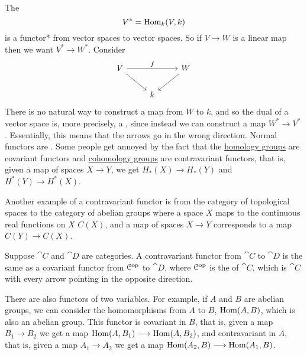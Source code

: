 \documentclass[11pt, oneside]{article}
\begin{document}
The \href{https://en.wikipedia.org/wiki/Dual_space}{}
$$
V^* = \operatorname{Hom}_k(V,k)
$$
is a functor* from vector spaces to vector spaces. So if $V\longrightarrow W$ is a linear map then we want $V^* \longrightarrow W^*$. Consider 
\[
\begin{tikzcd}
V \arrow[rr, "f"] \arrow[dr] && W\arrow[dl] \\ & k &
\end{tikzcd}
\]
There is no natural way to construct a map from $W$ to $k$, and so the dual of a vector space is, more precisely, a \href{https://en.wikipedia.org/wiki/Functor#Covariance_and_contravariance}{}, since instead we can construct a map $W^* \longrightarrow V^*$. Essentially, this means that the arrows go in the wrong direction. Normal functors are \href{https://en.wikipedia.org/wiki/Functor#Covariance_and_contravariance}{}. Some people get annoyed by the fact that the \href{https://en.wikipedia.org/wiki/Homology_(mathematics)}{\color{black}homology groups} are covariant functors and \href{https://en.wikipedia.org/wiki/Cohomology}{\color{black}cohomology groups} are contravariant functors, that is, given a map of spaces $X\longrightarrow Y$, we get $H_*(X) \longrightarrow H_*(Y)$ and $H^*(Y) \longrightarrow H^*(X)$.

Another example of a contravariant functor is from the category of topological spaces to the category of abelian groups where a space $X$ maps to the continuous real functions on $X$ $C(X)$, and a map of spaces $X\longrightarrow Y$ corresponds to a map  $C(Y) \longrightarrow C(X)$.

Suppose $\cat C$ and $\cat D$ are categories. A contravariant functor from $\cat C$ to $\cat D$ is the same as a covariant functor from $ {\mathcal C}\textsuperscript{op}$ to $\cat D$, where $ {\mathcal C}\textsuperscript{op}$ is the \href{https://en.wikipedia.org/wiki/Opposite_category}{} of $\cat C$, which is $\cat C$ with every arrow pointing in the opposite direction.

There are also functors of two variables. For example, if $A$ and $B$ are abelian groups, we can consider the homomorphisms from $A$ to $B$, $\operatorname{Hom}(A,B)$, which is also an abelian group. This functor is covariant in $B$, that is, given a map $B_1 \longrightarrow B_2$ we get a map $\operatorname{Hom}(A,B_1) \longrightarrow \operatorname{Hom}(A,B_2)$, and contravariant in $A$, that is, given a map $A_1\longrightarrow A_2$ we get a map $\operatorname{Hom}(A_2,B)\longrightarrow\operatorname{Hom}(A_1,B)$.
\end{document}
